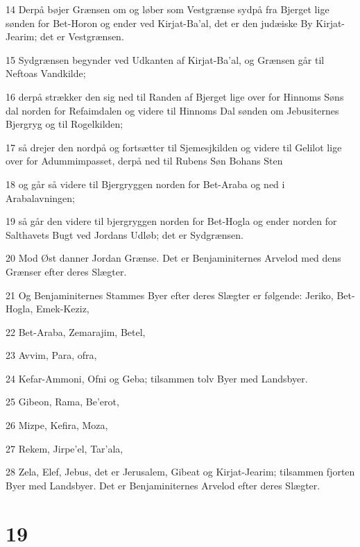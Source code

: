 \par 14 Derpå bøjer Grænsen om og løber som Vestgrænse sydpå fra Bjerget lige sønden for Bet-Horon og ender ved Kirjat-Ba'al, det er den judæiske By Kirjat-Jearim; det er Vestgrænsen.
\par 15 Sydgrænsen begynder ved Udkanten af Kirjat-Ba'al, og Grænsen går til Neftoas Vandkilde;
\par 16 derpå strækker den sig ned til Randen af Bjerget lige over for Hinnoms Søns dal norden for Refaimdalen og videre til Hinnoms Dal sønden om Jebusiternes Bjergryg og til Rogelkilden;
\par 17 så drejer den nordpå og fortsætter til Sjemesjkilden og videre til Gelilot lige over for Adummimpasset, derpå ned til Rubens Søn Bohans Sten
\par 18 og går så videre til Bjergryggen norden for Bet-Araba og ned i Arabalavningen;
\par 19 så går den videre til bjergryggen norden for Bet-Hogla og ender norden for Salthavets Bugt ved Jordans Udløb; det er Sydgrænsen.
\par 20 Mod Øst danner Jordan Grænse. Det er Benjaminiternes Arvelod med dens Grænser efter deres Slægter.
\par 21 Og Benjaminiternes Stammes Byer efter deres Slægter er følgende: Jeriko, Bet-Hogla, Emek-Keziz,
\par 22 Bet-Araba, Zemarajim, Betel,
\par 23 Avvim, Para, ofra,
\par 24 Kefar-Ammoni, Ofni og Geba; tilsammen tolv Byer med Landsbyer.
\par 25 Gibeon, Rama, Be'erot,
\par 26 Mizpe, Kefira, Moza,
\par 27 Rekem, Jirpe'el, Tar'ala,
\par 28 Zela, Elef, Jebus, det er Jerusalem, Gibeat og Kirjat-Jearim; tilsammen fjorten Byer med Landsbyer. Det er Benjaminiternes Arvelod efter deres Slægter.

\chapter{19}

